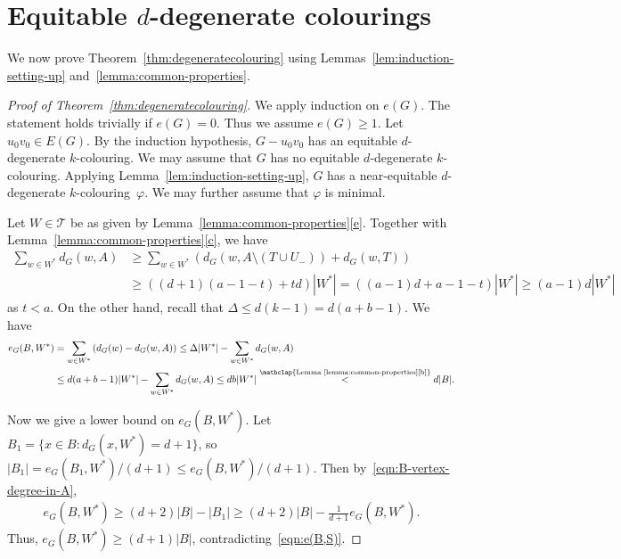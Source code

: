 \documentclass[11pt]{article}
\theoremstyle{plain}
\numberwithin{equation}{section}
\begin{document}
\section{Equitable $d$-degenerate colourings}\label{sec:proof2}

We now prove Theorem~\ref{thm:degeneratecolouring} using Lemmas~\ref{lem:induction-setting-up} and~\ref{lemma:common-properties}.

\begin{proof}[Proof of Theorem~\ref{thm:degeneratecolouring}]
We apply induction on $e(G)$. The statement  holds trivially if $e(G)=0$.
		Thus we assume $e(G) \ge 1$.
		Let $u_0v_0\in E(G)$.
		By the induction hypothesis, $G-u_0v_0$ has an equitable $d$-degenerate $k$-colouring. We may assume that $G$ has no
		equitable $d$-degenerate $k$-colouring.
		Applying Lemma~\ref{lem:induction-setting-up},
		$G$ has a near-equitable $d$-degenerate $k$-colouring~$\varphi$.
		We may further assume that $\varphi$ is minimal.
	


Let $W \in \mathcal{T}$ be as given by Lemma~\ref{lemma:common-properties}\ref{e}.
Together with Lemma~\ref{lemma:common-properties}\ref{c}, we have
\begin{align*}
	\sum_{w \in W^*} d_G(w,A) & \ge \sum_{w \in W^*} \left( d_G(w,A \setminus (T \cup U_-)) +  d_G(w, T) \right)\\
	& \ge \left((d+1)(a-1-t) + t d\right) |W^*|  = ((a-1)d + a-1-t )|W^*| \ge (a-1)d|W^*|
\end{align*}
as $ t < a$.
On the other hand, recall that $\Delta \le d(k-1) =d(a+b-1)$.
We have
\begin{align}\label{eqn:e(B,S)}
	e_G(B,W^*) & = \sum_{w \in W^*} \left( d_G(w)- d_G(w,A) \right) \le \Delta |W^*| - 	\sum_{w\in W^*} d_G(w,A) \nonumber \\
		& \le
		d(a+b-1)|W^*|- 	\sum_{w\in W^*} d_G(w,A)
		\le db |W^*|
		\overset{\mathclap{\text{Lemma~\ref{lemma:common-properties}\ref{b}}}}{<} d|B|.
\end{align}


Now we give a lower bound on $e_G(B,W^*)$.
Let $B_1=\{x\in B\colon d_G(x,W^*) =d+1\}$, so $|B_1| =e_G(B_1,W^*)/(d+1)\le e_G(B,W^*)/(d+1)$.
Then by~\eqref{eqn:B-vertex-degree-in-A},
\begin{align*}
e_G(B,W^*)\ge (d+2)|B|-|B_1|
\ge (d+2)|B|-\frac{1}{d+1}e_G(B,W^*).
\end{align*}
Thus, $e_G(B,W^*)\geq (d+1)|B|$, contradicting~\eqref{eqn:e(B,S)}.
\end{proof}
\end{document}
